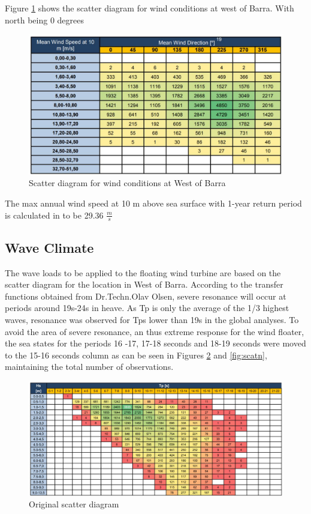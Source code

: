 \noindent Figure \ref{fig:scatterwind} shows the scatter diagram for wind conditions at west of Barra. With north being 0 degrees

\begin{figure}[H]
\centering
\includegraphics[scale=0.7]{figures/scatterwind}
\caption[$\; \:$Scatter diagram for wind conditions]{Scatter diagram for wind conditions at West of Barra \cite{Lifes50+D1.1} }
 \label{fig:scatterwind}
\end{figure}
 
 \noindent The max annual wind speed at 10 m above sea surface with 1-year return period is calculated in \cite{Lifes50+D1.1} to be  29.36 $\frac{m}{s}$



\subsection{Wave Climate}
The wave loads to be applied to the floating wind turbine are based on the scatter diagram for the location in West of Barra. According to the transfer functions obtained from Dr.Techn.Olav Olsen, severe resonance will occur at periods around 19s-24s in heave. As Tp is only the average of the 1/3 highest waves, resonance was observed for Tps lower than 19s in the global analyses. To avoid the area of severe resonance, an thus extreme response for the wind floater, the sea states for the periods 16 -17, 17-18 seconds and 18-19 seconds were moved to the 15-16 seconds column as can be seen in Figures \ref{fig:scato} and \ref{fig:scatn}, maintaining the total number of observations.

\begin{figure}[H]
\centering
\includegraphics[scale=0.5]{figures/scatteroriginal}
\caption[$\; \:$Original scatter diagram]{Original scatter diagram \cite{Lifes50+D1.1} }
 \label{fig:scato}
\end{figure}

